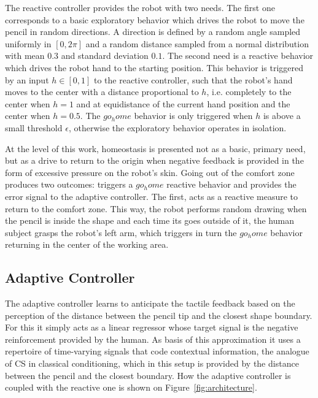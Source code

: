 \documentclass[letterpaper, 10 pt, conference]{ieeeconf}  %
\begin{document}
The reactive controller provides the robot with two needs. The first one corresponds to a basic exploratory behavior which drives the robot to move the pencil in random directions. A direction is defined by a random angle sampled uniformly in $[0, 2\pi]$ and a random distance  sampled from a normal distribution with mean $0.3$ and standard deviation $0.1$. The second need is a reactive behavior which drives the robot hand to the starting position. This behavior is triggered by an input $h \in [0,1]$ to the reactive controller, such that the robot's hand moves to the center with a distance proportional to $h$, i.e. completely to the center when $h=1$ and at equidistance of the current hand position and the center when $h=0.5$. The $go_home$ behavior is only triggered when $h$ is above a small threshold $\epsilon$, otherwise the exploratory behavior operates in isolation. 

At the level of this work, homeostasis is presented not as a basic, primary need, but as a drive to return to the origin when negative feedback is provided in the form of excessive pressure on the robot's skin. Going out of the comfort zone produces two outcomes: triggers a $go_home$ reactive behavior and provides the error signal to the adaptive controller. The first, acts as a reactive measure to return to the comfort zone. This way, the robot performs random drawing when the pencil is inside the shape and each time its goes outside of it, the human subject grasps the robot's left arm, which triggers in turn the $go_home$ behavior returning in the center of the working area.


\subsection{Adaptive Controller}

The adaptive controller learns to anticipate the tactile feedback based on the perception of the distance between the pencil tip and the closest shape boundary. For this it simply acts as a linear regressor whose target signal is the negative reinforcement provided by the human. As basis of this approximation it uses a repertoire of time-varying signals that code contextual information, the analogue of CS in classical conditioning, which in this setup is provided by the distance between the pencil and the closest boundary. How the adaptive controller is coupled with the reactive one is shown on Figure~\ref{fig:architecture}. 
\end{document}
